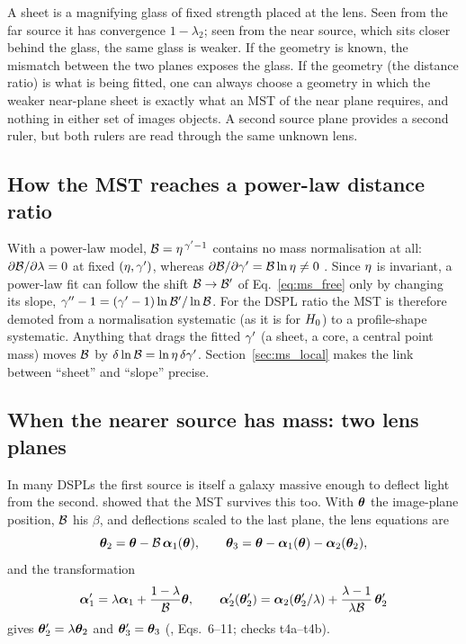 \begin{annotation}
A sheet is a magnifying glass of fixed strength placed at the lens.  Seen from
the far source it has convergence $1-\lambda_2$; seen from the near source,
which sits closer behind the glass, the same glass is weaker.  If the
geometry is known, the mismatch between the two planes exposes the glass.  If
the geometry (the distance ratio) is what is being fitted, one can always
choose a geometry in which the weaker near-plane sheet is exactly what an MST
of the near plane requires, and nothing in either set of images objects.  A
second source plane provides a second ruler, but both rulers are read through
the same unknown lens.
\end{annotation}

\subsection{How the MST reaches a power-law distance ratio}
\label{sec:ms_pl_reading}

With a power-law model, $\mathcal{B}=\eta^{\,\gamma'-1}$ contains no mass
normalisation at all: $\partial\mathcal{B}/\partial\lambda=0$ at fixed $(\eta,\gamma')$,
whereas $\partial\mathcal{B}/\partial\gamma'=\mathcal{B}\ln\eta\neq0$ .  Since
$\eta$ is invariant, a power-law fit can follow the shift
$\mathcal{B}\to\mathcal{B}'$ of Eq.~\eqref{eq:ms_free} only by changing its slope,
$\gamma''-1=(\gamma'-1)\ln\mathcal{B}'/\ln\mathcal{B}$.  For the DSPL ratio the MST is therefore
demoted from a normalisation systematic (as it is for $H_0$) to a
profile-shape systematic.  Anything that drags the fitted $\gamma'$ (a sheet, a
core, a central point mass) moves $\mathcal{B}$ by
$\delta\ln\mathcal{B}=\ln\eta\,\delta\gamma'$.  Section~\ref{sec:ms_local} makes the
link between ``sheet'' and ``slope'' precise.

\subsection{When the nearer source has mass: two lens planes}
\label{sec:ms_two_lens}

In many DSPLs the first source is itself a galaxy massive enough to deflect
light from the second.  \citet{schneider_2014_multiplane} showed that the MST
survives this too.  With $\boldsymbol{\theta}$ the image-plane position, $\mathcal{B}$ his
$\beta$, and deflections scaled to the last plane, the lens equations are
\begin{equation}
    \boldsymbol{\theta}_2=\boldsymbol{\theta}-\mathcal{B}\,\boldsymbol{\alpha}_1(\boldsymbol{\theta}),
    \qquad
    \boldsymbol{\theta}_3=\boldsymbol{\theta}-\boldsymbol{\alpha}_1(\boldsymbol{\theta})-\boldsymbol{\alpha}_2(\boldsymbol{\theta}_2),
    \label{eq:ms_twoplane}
\end{equation}
and the transformation
\begin{equation}
    \boldsymbol{\alpha}_1'=\lambda\boldsymbol{\alpha}_1+\frac{1-\lambda}{\mathcal{B}}\boldsymbol{\theta},
    \qquad
    \boldsymbol{\alpha}_2'(\boldsymbol{\theta}_2')=\boldsymbol{\alpha}_2(\boldsymbol{\theta}_2'/\lambda)
       +\frac{\lambda-1}{\lambda\mathcal{B}}\,\boldsymbol{\theta}_2'
    \label{eq:ms_schneider}
\end{equation}
gives $\boldsymbol{\theta}_2'=\lambda\boldsymbol{\theta}_2$ and $\boldsymbol{\theta}_3'=\boldsymbol{\theta}_3$
(\citealp{schneider_2014_multiplane}, Eqs.~6--11; checks t4a--t4b).

